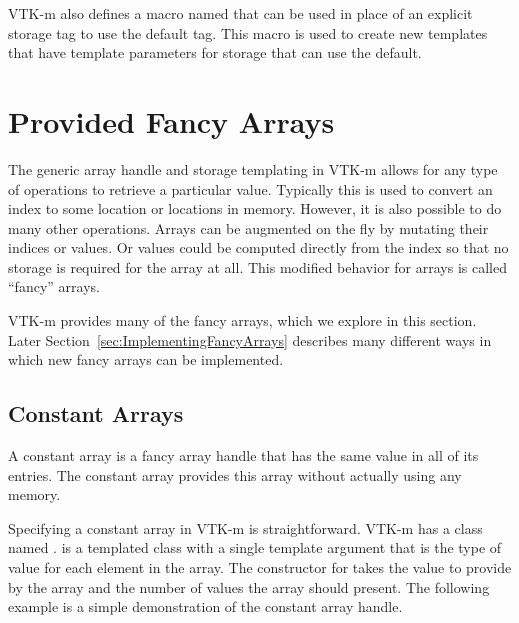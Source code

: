 
VTK-m also defines a macro named 
that can be used in place of an explicit storage tag to use the
default tag. This macro is used to create new templates that have template
parameters for storage that can use the default.



\section{Provided Fancy Arrays}
\label{sec:ProvidedFancyArrays}

The generic array handle and storage templating in VTK-m allows for
any type of operations to retrieve a particular value. Typically this is
used to convert an index to some location or locations in memory. However,
it is also possible to do many other operations. Arrays can be augmented on
the fly by mutating their indices or values. Or values could be computed
directly from the index so that no storage is required for the array at
all. This modified behavior for arrays is called ``fancy'' arrays.

VTK-m provides many of the fancy arrays, which we explore in this section.
Later Section~\ref{sec:ImplementingFancyArrays} describes many different
ways in which new fancy arrays can be implemented.

\subsection{Constant Arrays}
\label{sec:ConstantArrays}


A constant array is a fancy array handle that has the same value in all of
its entries. The constant array provides this array without actually using
any memory.

Specifying a constant array in VTK-m is straightforward. VTK-m has a class
named . 
is a templated class with a single template argument that is the type of
value for each element in the array. The constructor for
 takes the value to provide by the
array and the number of values the array should present. The following
example is a simple demonstration of the constant array handle.

